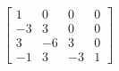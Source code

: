 \documentclass[preview]{standalone}
\begin{document}
\begin{align*}
\begin{bmatrix} 1 & 0 & 0 & 0 \\ -3 & 3 & 0 & 0 \\ 3 & -6 & 3 & 0 \\ -1 & 3 & -3 & 1 \end{bmatrix}
\end{align*}
\end{document}

